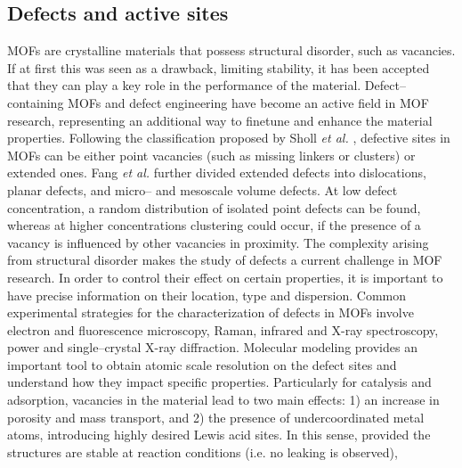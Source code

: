 \subsection*{Defects and active sites}
MOFs are crystalline materials that possess structural disorder, such as vacancies. If at first this was seen as a drawback, limiting stability, it has been accepted that they can play a key role in the performance of the material. Defect--containing MOFs and defect engineering have become an active field in MOF research, representing an additional way to finetune and enhance the material properties. 
Following the classification proposed by Sholl \textit{et al.} \cite{sholl2015defects}, defective sites in MOFs can be either point vacancies (such as missing linkers or clusters) or extended ones. Fang \textit{et al.} \cite{fang2015defect} further divided extended defects into dislocations, planar defects, and micro-- and mesoscale volume defects. 
\npar
At low defect concentration, a random distribution of isolated point defects can be found, whereas at higher concentrations clustering could occur\cite{cliffe2014correlated}, if the presence of a vacancy is influenced by other vacancies in proximity. The complexity arising from structural disorder makes the study of defects a current challenge in MOF research. In order to control their effect on certain properties, it is important to have precise information on their location, type and dispersion. Common experimental strategies for the characterization of defects in MOFs involve electron and fluorescence microscopy, Raman, infrared and X-ray spectroscopy, power and single--crystal X-ray diffraction\cite{fang2015defect}. Molecular modeling provides an important tool to obtain atomic scale resolution on the defect sites and understand how they impact specific properties.
\npar
Particularly for catalysis and adsorption, vacancies in the material lead to two main effects: 1) an increase in porosity and mass transport, and 2) the presence of undercoordinated metal atoms, introducing highly desired Lewis acid sites. 
In this sense, provided the structures are stable at reaction conditions (i.e. no leaking is observed), 

